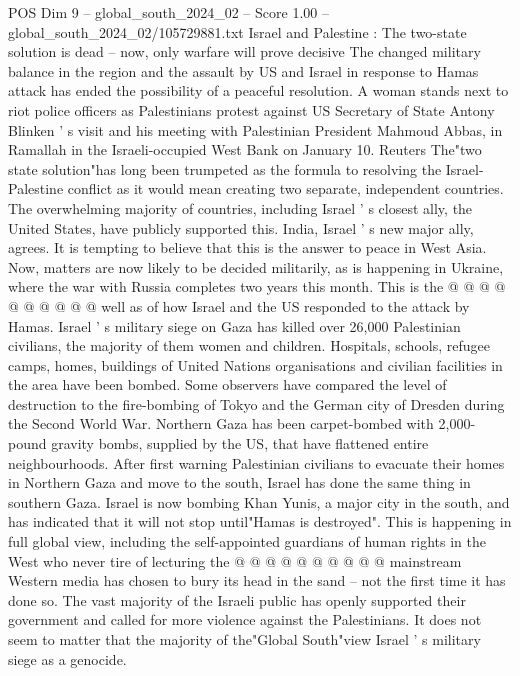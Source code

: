 \begin{textsample}{POS Dim 9 – global\_south\_2024\_02 – Score 1.00 – global\_south\_2024\_02/105729881.txt}  \label{ex:f9_pos_097}
Israel and Palestine : The two-state solution is dead -- now, only warfare will prove decisive The changed military balance in the region and the assault by US and Israel in response to Hamas attack has ended the possibility of a peaceful resolution.
A woman stands next to riot police officers as Palestinians protest against US Secretary of State Antony Blinken ' s visit and his meeting with Palestinian President Mahmoud Abbas, in Ramallah in the Israeli-occupied West Bank on January 10.
Reuters The"two state solution"has long been trumpeted as the formula to resolving the Israel-Palestine conflict as it would mean creating two separate, independent countries.
The overwhelming majority of countries, including Israel ' s closest ally, the United States, have publicly supported this.
India, Israel ' s new major ally, agrees.
It is tempting to believe that this is the answer to peace in West Asia.
Now, matters are now likely to be decided militarily, as is happening in Ukraine, where the war with Russia completes two years this month.
This is the @ @ @ @ @ @ @ @ @ @ well as of how Israel and the US responded to the attack by Hamas.
Israel ' s military siege on Gaza has killed over 26,000 Palestinian civilians, the majority of them women and children.
Hospitals, schools, refugee camps, homes, buildings of United Nations organisations and civilian facilities in the area have been bombed.
Some observers have compared the level of destruction to the fire-bombing of Tokyo and the German city of Dresden during the Second World War.
Northern Gaza has been carpet-bombed with 2,000-pound gravity bombs, supplied by the US, that have flattened entire neighbourhoods.
After first warning Palestinian civilians to evacuate their homes in Northern Gaza and move to the south, Israel has done the same thing in southern Gaza.
Israel is now bombing Khan Yunis, a major city in the south, and has indicated that it will not stop until"Hamas is destroyed".
This is happening in full global view, including the self-appointed guardians of human rights in the West who never tire of lecturing the @ @ @ @ @ @ @ @ @ @ mainstream Western media has chosen to bury its head in the sand -- not the first time it has done so.
The vast majority of the Israeli public has openly supported their government and called for more violence against the Palestinians.
It does not seem to matter that the majority of the"Global South"view Israel ' s military siege as a genocide.

\end{textsample}
